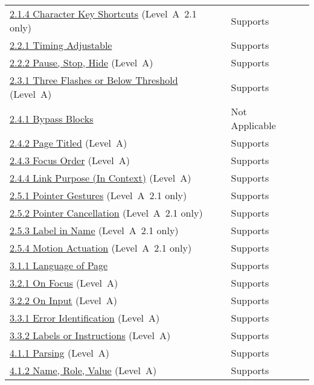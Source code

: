 \documentclass{report}
\begin{document}
\begin{longtable}{p{}<{\RaggedRight}p{}<{\RaggedRight}p{}<{\RaggedRight}}
  \href{https://www.w3.org/TR/WCAG21/#character-key-shortcuts}{2.1.4
  Character Key Shortcuts} (Level~A~2.1 only) & Supports \\
        \href{http://www.w3.org/TR/WCAG20/#time-limits-required-behaviors}{2.2.1
  Timing Adjustable} & Supports\\
  \href{http://www.w3.org/TR/WCAG20/#time-limits-pause}{2.2.2 Pause, Stop,
  Hide} (Level~A) & Supports\\
  \href{http://www.w3.org/TR/WCAG20/#seizure-does-not-violate}{2.3.1
  Three Flashes or Below Threshold} (Level~A) & Supports\\
  \href{http://www.w3.org/TR/WCAG20/#navigation-mechanisms-skip}{2.4.1
  Bypass Blocks} & Not Applicable\\
  \href{http://www.w3.org/TR/WCAG20/#navigation-mechanisms-title}{2.4.2 Page Titled} (Level~A) & Supports\\
  \href{http://www.w3.org/TR/WCAG20/#navigation-mechanisms-focus-order}{2.4.3 Focus Order} (Level~A) & Supports\\
  \href{http://www.w3.org/TR/WCAG20/#navigation-mechanisms-refs}{2.4.4 Link Purpose (In Context)} (Level~A) & Supports\\
  \href{https://www.w3.org/TR/WCAG21/#pointer-gestures}{2.5.1 Pointer Gestures} (Level~A~2.1 only) & Supports\\
  \href{https://www.w3.org/TR/WCAG21/#pointer-cancellation}{2.5.2
  Pointer Cancellation} (Level~A~2.1 only) &  Supports\\
  \href{https://www.w3.org/TR/WCAG21/#label-in-name}{2.5.3 Label in Name} (Level~A~2.1 only) & Supports\\
  \href{https://www.w3.org/TR/WCAG21/#motion-actuation}{2.5.4 Motion Actuation} (Level~A~2.1 only) & Supports\\
  \href{http://www.w3.org/TR/WCAG20/#meaning-doc-lang-id}{3.1.1 Language of Page} & Supports\\
  \href{http://www.w3.org/TR/WCAG20/#consistent-behavior-receive-focus}{3.2.1 On Focus} (Level~A) & Supports\\
  \href{http://www.w3.org/TR/WCAG20/#consistent-behavior-unpredictable-change}{3.2.2 On Input} (Level~A) & Supports\\
  \href{http://www.w3.org/TR/WCAG20/#minimize-error-identified}{3.3.1 Error Identification} (Level~A) & Supports\\
        \href{http://www.w3.org/TR/WCAG20/#minimize-error-cues}{3.3.2 Labels or Instructions} (Level~A) & Supports\\
  \href{http://www.w3.org/TR/WCAG20/#ensure-compat-parses}{4.1.1 Parsing} (Level~A) & Supports\\
  \href{http://www.w3.org/TR/WCAG20/#ensure-compat-rsv}{4.1.2 Name,
  Role, Value} (Level~A) & Supports\\
\end{longtable}
\end{document}
